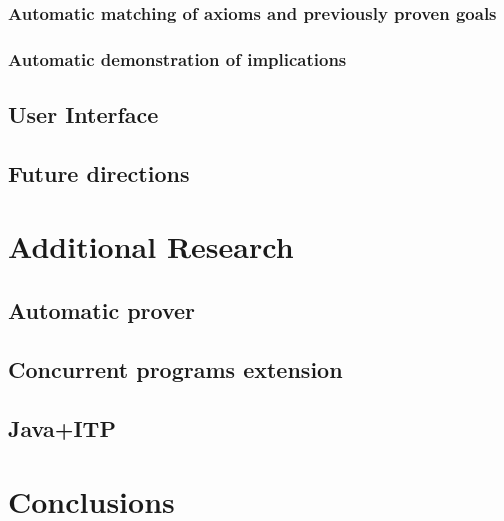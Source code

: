 \documentclass[12pt,a4paper]{article}
\begin{document}
\subsubsection{Automatic matching of axioms and previously proven goals}
\subsubsection{Automatic demonstration of implications}
\subsection{User Interface}
\subsection{Future directions}
\section{Additional Research}
\subsection{Automatic prover}
\subsection{Concurrent programs extension}
\subsection{Java+ITP}

\section{Conclusions}
\end{document}
